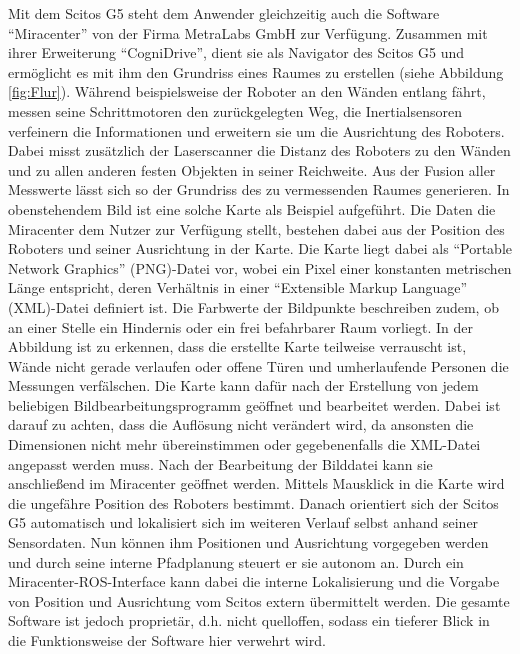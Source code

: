 Mit dem Scitos G5 steht dem Anwender gleichzeitig auch die Software "`Miracenter"' von der Firma MetraLabs GmbH zur Verfügung. Zusammen mit ihrer Erweiterung "`CogniDrive"', dient sie als Navigator des Scitos G5 und ermöglicht es mit ihm den Grundriss eines Raumes zu erstellen (siehe Abbildung \ref{fig:Flur}). Während beispielsweise der Roboter an den Wänden entlang fährt, messen seine Schrittmotoren den zurückgelegten Weg, die Inertialsensoren verfeinern die Informationen und erweitern sie um die Ausrichtung des Roboters. Dabei misst zusätzlich der Laserscanner die Distanz des Roboters zu den Wänden und zu allen anderen festen Objekten in seiner Reichweite. Aus der Fusion aller Messwerte lässt sich so der Grundriss des zu vermessenden Raumes generieren. In obenstehendem Bild ist eine solche Karte als Beispiel aufgeführt. Die Daten die Miracenter dem Nutzer zur Verfügung stellt, bestehen dabei aus der Position des Roboters und seiner Ausrichtung in der Karte. Die Karte liegt dabei als "`Portable Network Graphics"' (PNG)-Datei vor, wobei ein Pixel einer konstanten metrischen Länge entspricht, deren Verhältnis in einer "`Extensible Markup Language"' (XML)-Datei definiert ist. Die Farbwerte der Bildpunkte beschreiben zudem, ob an einer Stelle ein Hindernis oder ein frei befahrbarer Raum vorliegt. In der Abbildung ist zu erkennen, dass die erstellte Karte teilweise verrauscht ist, Wände nicht gerade verlaufen oder offene Türen und umherlaufende Personen die Messungen verfälschen. Die Karte kann dafür nach der Erstellung von jedem beliebigen Bildbearbeitungsprogramm geöffnet und bearbeitet werden. Dabei ist darauf zu achten, dass die Auflösung nicht verändert wird, da ansonsten die Dimensionen nicht mehr übereinstimmen oder gegebenenfalls die XML-Datei angepasst werden muss. Nach der Bearbeitung der Bilddatei kann sie anschließend im Miracenter geöffnet werden. Mittels Mausklick in die Karte wird die ungefähre Position des Roboters bestimmt. Danach orientiert sich der Scitos G5 automatisch und lokalisiert sich im weiteren Verlauf selbst anhand seiner Sensordaten. Nun können ihm Positionen und Ausrichtung vorgegeben werden und durch seine interne Pfadplanung steuert er sie autonom an. Durch ein Miracenter-ROS-Interface kann dabei die interne Lokalisierung und die Vorgabe von Position und Ausrichtung vom Scitos extern übermittelt werden. Die gesamte Software ist jedoch proprietär, d.h. nicht quelloffen, sodass ein tieferer Blick in die Funktionsweise der Software hier verwehrt wird.
